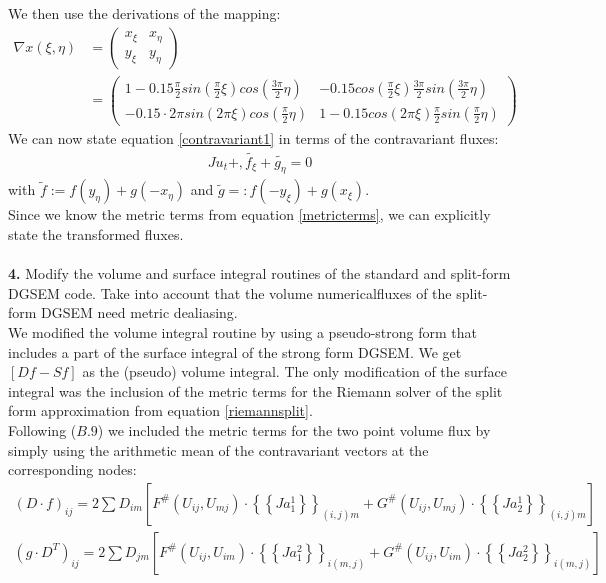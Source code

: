 \documentclass[11pt]{scrartcl}
\begin{document}
We then use the derivations of the mapping:
\begin{align}
\nabla x(\xi, \eta) &= 
\begin{pmatrix}
x_\xi & x_\eta\\
y_\xi & y_\eta
\end{pmatrix} \nonumber \\ &=
\begin{pmatrix}
1 - 0.15 \frac{\pi}{2} sin(\frac{\pi}{2}\xi) cos(\frac{3\pi}{2} \eta) &
- 0.15 cos(\frac{\pi}{2}\xi) \frac{3\pi}{2} sin(\frac{3\pi}{2} \eta) \\
- 0.15 \cdot 2\pi sin(2\pi\xi) cos(\frac{\pi}{2} \eta) &
1 - 0.15 cos(2\pi \xi) \frac{\pi}{2}  sin(\frac{\pi}{2} \eta)
\end{pmatrix}
\label{metricterms}
\end{align}
We can now state equation \ref{contravariant1} in terms of the contravariant fluxes:
\begin{align}
 J u_t + ,\tilde{f_\xi} + \tilde{g_\eta} = 0
 \label{contravariantequation}
\end{align}
with $\tilde{f} := f(y_\eta) + g(-x_\eta)$ and $\tilde{g} =: f(-y_\xi) + g(x_\xi)$.
\\Since we know the metric terms from equation \ref{metricterms}, we can explicitly state the transformed fluxes. \\ \ \\
\textbf{4.} Modify the volume and surface integral routines of the standard and split-form DGSEM code. Take into account that the volume numericalfluxes of the split-form DGSEM need metric dealiasing.\\

We modified the volume integral routine by using a pseudo-strong form that includes a part of the surface integral of the strong form DGSEM. We get $[Df - Sf]$ as the (pseudo) volume integral. The only modification of the surface integral was the inclusion of the metric terms for the Riemann solver of the split form approximation from equation \ref{riemannsplit}. \\
Following \cite{Gassner_2016} ($B.9$) we included the metric terms for the two point volume flux by simply using the arithmetic mean of the contravariant vectors at the corresponding nodes:
\begin{align*}
(D \cdot f)_{ij} = 2 \sum D_{im} \left[ F^{\#}(U_{ij}, U_{mj}) \cdot \left\{\left\{ Ja^1_1 \right\}\right\}_{(i,j)m} + G^{\#}(U_{ij}, U_{mj}) \cdot \left\{\left\{ Ja^1_2 \right\}\right\}_{(i,j)m} \right] \\
(g \cdot D^T)_{ij} = 2 \sum D_{jm} \left[ F^{\#}(U_{ij}, U_{im}) \cdot \left\{\left\{ Ja^2_1 \right\}\right\}_{i(m,j)} + G^{\#}(U_{ij}, U_{im}) \cdot \left\{\left\{ Ja^2_2 \right\}\right\}_{i(m,j)} \right]
\end{align*}
\end{document}
